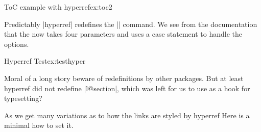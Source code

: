 \begin{texexample}{ToC example with hyperref}{ex:toc2}
%
\end{texexample}

Predictably |hyperref| redefines the |\contentsline| command. We see from the documentation that 
the \cmd{\contentsline} now takes four parameters and uses a case statement to handle the options.
\begin{teX}
\def\contentsline#1#2#3#4{%
  \ifx\\#4\\%
    	\csname l@#1\endcsname{#2}{#3}%
  \else
 	\ifcase\Hy@linktoc %
 		\csname l@#1\endcsname{#2}{#3}%
 	\or %
 		\csname l@#1\endcsname{%
  	   \hyper@linkstart{link}{#4}{#2}\hyper@linkend
    	}{#3}%
  	 \or %
		\csname l@#1\endcsname{{#2}}{%
    	\hyper@linkstart{link}{#4}{#3}\hyper@linkend
    	}%
 	\else %
 		\csname l@#1\endcsname{%
 	\hyper@linkstart{link}{#4}{#2}\hyper@linkend
 	}{%
 	\hyper@linkstart{link}{#4}{#3}\hyper@linkend
 	}%
 	\fi
 \fi
}
\end{teX}

\begin{texexample}{Hyperref Test}{ex:testhyper}
\bgroup
\makeatletter
\edef\one{section}
\edef\two{ {\numberline {2}Second Chapter}}
\edef\three{5}
\edef\four{chapter.2}

\makeatother
\egroup
\end{texexample}

Moral of a long story beware of redefinitions by other packages. But at least hyperref did not redefine |l@section|,
which was left for us to use as a hook for typesetting? 

As we get many variations as to how the links are styled by hyperref
Here is a minimal how to set it.

